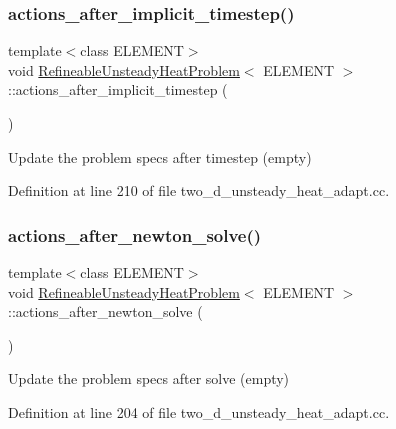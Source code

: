 \subsubsection{\texorpdfstring{actions\+\_\+after\+\_\+implicit\+\_\+timestep()}{actions\_after\_implicit\_timestep()}}
{\footnotesize\ttfamily template$<$class E\+L\+E\+M\+E\+NT$>$ \\
void \hyperlink{classRefineableUnsteadyHeatProblem}{Refineable\+Unsteady\+Heat\+Problem}$<$ E\+L\+E\+M\+E\+NT $>$\+::actions\+\_\+after\+\_\+implicit\+\_\+timestep (\begin{DoxyParamCaption}{ }\end{DoxyParamCaption})\hspace{0.3cm}{\ttfamily [inline]}}



Update the problem specs after timestep (empty) 



Definition at line 210 of file two\+\_\+d\+\_\+unsteady\+\_\+heat\+\_\+adapt.\+cc.

\mbox{\label{classRefineableUnsteadyHeatProblem_ada522772b79e92a75edf3724d0a273da}} 
\subsubsection{\texorpdfstring{actions\+\_\+after\+\_\+newton\+\_\+solve()}{actions\_after\_newton\_solve()}}
{\footnotesize\ttfamily template$<$class E\+L\+E\+M\+E\+NT$>$ \\
void \hyperlink{classRefineableUnsteadyHeatProblem}{Refineable\+Unsteady\+Heat\+Problem}$<$ E\+L\+E\+M\+E\+NT $>$\+::actions\+\_\+after\+\_\+newton\+\_\+solve (\begin{DoxyParamCaption}{ }\end{DoxyParamCaption})\hspace{0.3cm}{\ttfamily [inline]}}



Update the problem specs after solve (empty) 



Definition at line 204 of file two\+\_\+d\+\_\+unsteady\+\_\+heat\+\_\+adapt.\+cc.

